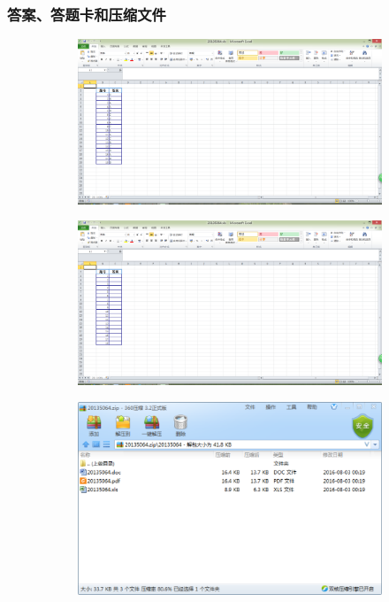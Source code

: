         \subsubsection{答案、答题卡和压缩文件}
            \begin{figure}
                \centering
                \begin{subfigure}[b]{0.4\textwidth}
                    \includegraphics[width=\textwidth]{images/answer.jpg}
                    \caption{}
                    \label{fig:答案}
                \end{subfigure}
                \begin{subfigure}[b]{0.4\textwidth}
                    \includegraphics[width=\textwidth]{images/answer_card.jpg}
                    \caption{}
                    \label{fig:答题卡}
                \end{subfigure}
                \begin{subfigure}[b]{0.5\textwidth}
                    \includegraphics[width=\textwidth]{images/compressed_files.jpg}

\end{subfigure}
\end{figure}
